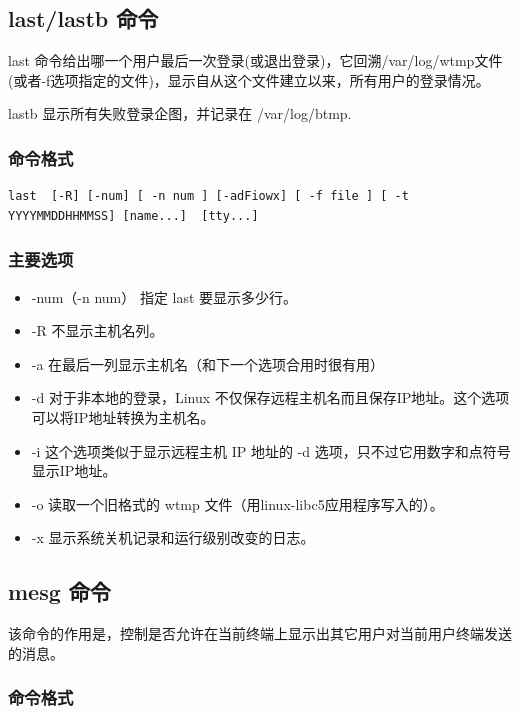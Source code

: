 \subsection{last/lastb 命令}

last
命令给出哪一个用户最后一次登录(或退出登录)，它回溯/var/log/wtmp文件(或者-f选项指定的文件)，显示自从这个文件建立以来，所有用户的登录情况。

lastb 显示所有失败登录企图，并记录在 /var/log/btmp.

\subsubsection{命令格式}

{\begin{shaded}\begin{verbatim}
last  [-R] [-num] [ -n num ] [-adFiowx] [ -f file ] [ -t YYYYMMDDHHMMSS] [name...]  [tty...]
\end{verbatim}\end{shaded}}
\subsubsection{主要选项}

\begin{itemize}
\item
  -num（-n num） 指定 last 要显示多少行。
\item
  -R 不显示主机名列。
\item
  -a 在最后一列显示主机名（和下一个选项合用时很有用）
\item
  -d 对于非本地的登录，Linux
  不仅保存远程主机名而且保存IP地址。这个选项可以将IP地址转换为主机名。
\item
  -i 这个选项类似于显示远程主机 IP 地址的 -d
  选项，只不过它用数字和点符号显示IP地址。
\item
  -o 读取一个旧格式的 wtmp 文件（用linux-libc5应用程序写入的）。
\item
  -x 显示系统关机记录和运行级别改变的日志。
\end{itemize}
\subsection{mesg 命令}

该命令的作用是，控制是否允许在当前终端上显示出其它用户对当前用户终端发送的消息。

\subsubsection{命令格式}

